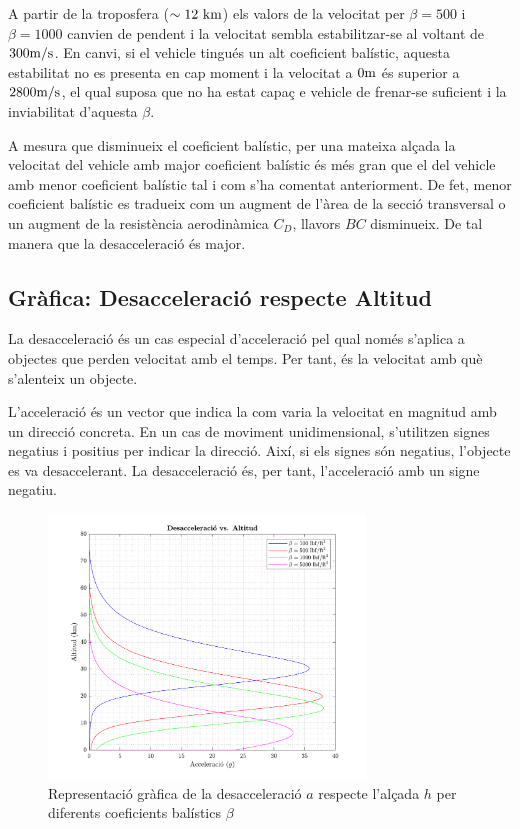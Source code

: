 A partir de la troposfera ($\sim 12 \ \kilo\meter$) els valors de la velocitat per $\beta=500$ i $\beta=1000$ canvien de pendent i la velocitat sembla estabilitzar-se al voltant de $300 \meter/\second$. En canvi, si el vehicle tingués un alt coeficient balístic, aquesta estabilitat no es presenta en cap moment i la velocitat a $0 \meter$ és superior a $2800 \meter/\second$, el qual suposa que no ha estat capaç e vehicle de frenar-se suficient i la inviabilitat d'aquesta $\beta$.

A mesura que disminueix el coeficient balístic, per una mateixa alçada la velocitat del vehicle amb major coeficient balístic és més gran que el del vehicle amb menor coeficient balístic tal i com s'ha comentat anteriorment. De fet, menor coeficient balístic es tradueix com un augment de l'àrea de la secció transversal o un augment de la resistència aerodinàmica $C_D$, llavors $BC$ disminueix. De tal manera que la desacceleració és major.

\newpage
\subsection{Gràfica: Desacceleració respecte Altitud}
La desacceleració és un cas especial d’acceleració pel qual només s’aplica a objectes que perden velocitat amb el temps. Per tant, és la velocitat amb què s’alenteix un objecte.

L'acceleració és un vector que indica la com varia la velocitat en magnitud amb un direcció concreta. En un cas de moviment unidimensional, s'utilitzen signes negatius i positius per indicar la direcció. Així, si els signes són negatius, l'objecte es va desaccelerant. La desacceleració és, per tant, l'acceleració amb un signe negatiu. 

\begin{figure}[ht]
    \centering
    \includegraphics[width=0.75\textwidth]{imagenes/01_ballistic_graficas/desacceleracio.pdf}
    \caption{Representació gràfica de la desacceleració $a$ respecte l'alçada $h$ per diferents coeficients balístics $\beta$}
    \label{fig:desacceleracio}
\end{figure}

